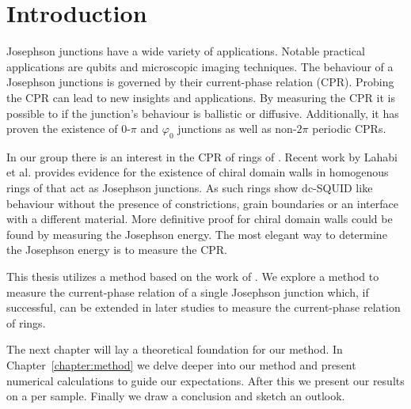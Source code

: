 \chapter{Introduction}
Josephson junctions have a wide variety of applications. Notable practical applications are qubits\cite{placeNewMaterialPlatform2021,pechenezhskiySuperconductingQuasichargeQubit2020} and microscopic imaging techniques\cite{clarkeSQUIDHandbook2004,rogSQUIDontipMagneticMicroscopy2022}. The behaviour of a Josephson junctions is governed by their current-phase relation (CPR). Probing the CPR can lead to new insights and applications. By measuring the CPR it is possible to if the junction's behaviour is ballistic or diffusive\cite{endresCurrentPhaseRelation2023a,kayyalhaHighlySkewedCurrent2020}. Additionally, it has proven the existence of $0$-$\pi$ and $\varphi_0$ junctions\cite{frolovMeasurementCurrentPhaseRelation2004,muraniBallisticEdgeStates2017} as well as non-$2\pi$ periodic CPRs\cite{endresCurrentPhaseRelation2023}.

In our group there is an interest in the CPR of rings of . Recent work by Lahabi et al. provides evidence for the existence of chiral domain walls in homogenous rings of \cite{lahabiSpintripletSupercurrentsOdd2018} that act as Josephson junctions. As such  rings show dc-SQUID like behaviour without the presence of constrictions, grain boundaries or an interface with a different material. More definitive proof for chiral domain walls could be found by measuring the Josephson energy\cite{lahabiSpintripletSupercurrentsOdd2018,sigristRoleDomainWalls1999}. The most elegant way to determine the Josephson energy is to measure the CPR.

This thesis utilizes a method based on the work of \citeauthor{frolovMeasurementCurrentPhaseRelation2004} \cite{frolovMeasurementCurrentPhaseRelation2004,frolovCurrentphaseRelationsJosephson2005}. We explore a method to measure the current-phase relation of a single Josephson junction which, if successful, can be extended in later studies to measure the current-phase relation of  rings.

The next chapter will lay a theoretical foundation for our method. In Chapter~\ref{chapter:method} we delve deeper into our method and present numerical calculations to guide our expectations. After this we present our results on a per sample. Finally we draw a conclusion and sketch an outlook.